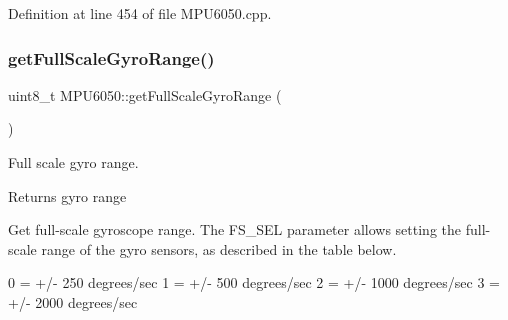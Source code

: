 Definition at line 454 of file M\+P\+U6050.\+cpp.


\begin{DoxyCode}{0}

\end{DoxyCode}
\mbox{\label{classMPU6050_acb1fa088d43d76230106a3226f343013}} 
\subsubsection{\texorpdfstring{getFullScaleGyroRange()}{getFullScaleGyroRange()}}
{\footnotesize\ttfamily uint8\+\_\+t M\+P\+U6050\+::get\+Full\+Scale\+Gyro\+Range (\begin{DoxyParamCaption}{ }\end{DoxyParamCaption})}

Full scale gyro range.

\begin{DoxyReturn}{Returns}
gyro range
\end{DoxyReturn}
Get full-\/scale gyroscope range. The F\+S\+\_\+\+S\+EL parameter allows setting the full-\/scale range of the gyro sensors, as described in the table below.


\begin{DoxyPre}
0 = +/- 250 degrees/sec
1 = +/- 500 degrees/sec
2 = +/- 1000 degrees/sec
3 = +/- 2000 degrees/sec
\end{DoxyPre}


